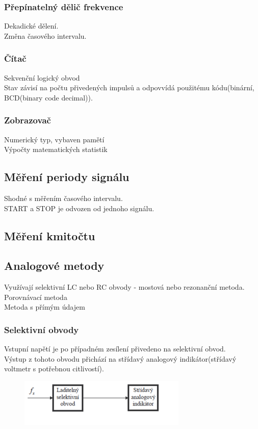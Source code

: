 \subsubsection*{Přepínatelný dělič frekvence}
Dekadické dělení.\\
Změna časového intervalu.\\

\subsubsection*{Čítač}
Sekvenční logický obvod \\
Stav závisí na počtu přivedených impulsů a odpovvídá použitému kódu(binární, BCD(binary code decimal)).\\

\subsubsection*{Zobrazovač}
Numerický typ, vybaven pamětí\\
Výpočty matematických statistik\\

\subsection*{Měření periody signálu}
Shodné s měřením časového intervalu.\\
START a STOP je odvozen od jednoho signálu.\\

\subsection*{Měření kmitočtu}

\subsection*{Analogové metody}
Využívají selektivní LC nebo RC obvody - mostová nebo rezonanční metoda.\\
Porovnávací metoda\\
Metoda s přímým údajem\\
\newpage 

\subsubsection*{Selektivní obvody}
Vstupní napětí je po případném zesílení přivedeno na selektivní obvod.\\
Výstup z tohoto obvodu přichází na střídavý analogový indikátor(střídavý voltmetr s potřebnou citlivostí).\\
\begin{figure}[H]
    \includegraphics*[scale = 1.3]{images/selekivniObvod.png}
\end{figure}

